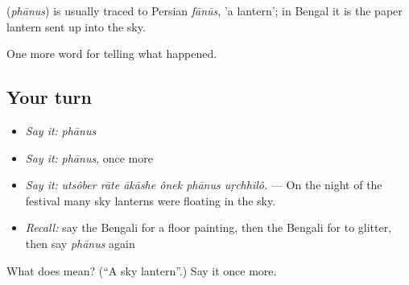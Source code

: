 \begin{cousinweb}
\textbf{} (\emph{phānus}) is usually traced to Persian \emph{fānūs}, 'a lantern'; in Bengal it is the paper lantern sent up into the sky.
\end{cousinweb}

\begin{grammarlens}[title={What you've built}]
One more word for telling what happened.
\end{grammarlens}

\subsection*{Your turn}
\begin{itemize}
\raggedright
  \item \emph{Say it:} \emph{phānus}
  \item \emph{Say it:} \emph{phānus}, once more
  \item \emph{Say it:} \emph{utsôber rāte ākāshe ônek phānus uṛchhilô.} — On the night of the festival many sky lanterns were floating in the sky.
  \item \emph{Recall:} say the Bengali for a floor painting, then the Bengali for to glitter, then say \emph{phānus} again
\end{itemize}

\begin{tcolorbox}[breakable,colback=teal!4,colframe=teal!35!black,title={Before you move on}]
What does  mean? (\textquotedblleft{}A sky lantern\textquotedblright{}.) Say it once more.
\end{tcolorbox}
